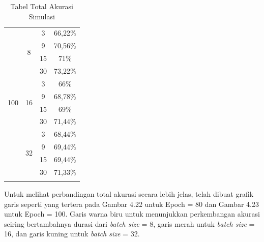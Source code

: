 \begin{longtable}[Hc]{|c|c|c|c|}
	\multirow{12}{*}{100}                & \multirow{4}{*}{8}                       & 3                                            & 66,22\%                                     \\ \cline{3-4} 
	&                                          & 9                                            & 70,56\%                                     \\ \cline{3-4} 
	&                                          & 15                                           & 71\%                                        \\ \cline{3-4} 
	&                                          & 30                                           & 73,22\%                                     \\ \cline{2-4} 
	& \multirow{4}{*}{16}                      & 3                                            & 66\%                                     \\ \cline{3-4} 
	&                                          & 9                                            & 68,78\%                                     \\ \cline{3-4} 
	&                                          & 15                                           & 69\%                                        \\ \cline{3-4} 
	&                                          & 30                                           & 71,44\%                                     \\ \cline{2-4} 
	& \multirow{4}{*}{32}                      & 3                                            & 68,44\%                                     \\ \cline{3-4} 
	&                                          & 9                                            & 69,44\%                                     \\ \cline{3-4} 
	&                                          & 15                                           & 69,44\%                                     \\ \cline{3-4} 
	&                                          & 30                                           & 71,33\%                                     \\ \hline
	\caption{Tabel Total Akurasi Simulasi}
	\label{tab:my-table}\\
\end{longtable}

Untuk melihat perbandingan total akurasi secara lebih jelas, telah dibuat grafik garis seperti yang tertera pada Gambar 4.22 untuk Epoch = 80 dan Gambar 4.23 untuk Epoch = 100. Garis warna biru untuk menunjukkan perkembangan akurasi seiring bertambahnya durasi dari \emph{batch size} = 8, garis merah untuk \emph{batch size} = 16, dan garis kuning untuk \emph{batch size} = 32.

